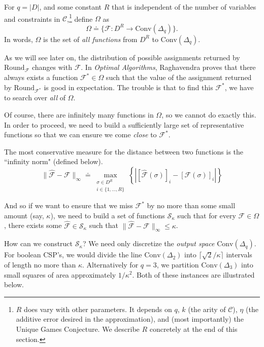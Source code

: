 \documentclass[letterpaper, 12pt]{article}
\numberwithin{equation}{section}
\begin{document}
For $q = |D|$, and some constant $R$ that is independent of the number of variables and constraints in $\mathcal{C}$,\footnote{$R$ does vary with other parameters. It depends on $q$, $k$ (the arity of $\mathcal{C}$), $\eta$ (the additive error desired in the approximation), and (most importantly) the Unique Games Conjecture. We describe $R$ concretely at the end of this section.}  define $\Omega$ as
\begin{equation}
\Omega \doteq \{ \mathcal{F} : D^R \to \text{Conv}(\Delta_q) \}.
\end{equation}
In words, $\Omega$ is the set of \textit{all functions} from $D^R$ to $\text{Conv}(\Delta_q)$.

As we will see later on, the distribution of possible assignments returned by $\text{Round}_{\mathcal{F}}$ changes with $\mathcal{F}$. In \textit{Optimal Algorithms}, Raghavendra proves that there always exists a function $\mathcal{F}^* \in \Omega$ such that the value of the assignment returned by $\text{Round}_{\mathcal{F}^*}$ is good in expectation. The trouble is that to find this $\mathcal{F}^*$, we have to search over \textit{all} of $\Omega$.

Of course, there are infinitely many functions in $\Omega$, so we cannot do exactly this. In order to proceed, we need to build a sufficiently large set of representative functions so that we can ensure we come \textit{close} to  $\mathcal{F}^*$.

The most conservative measure for the distance between two functions is the ``infinity norm" (defined below).
\begin{equation}
\| \hat{\mathcal{F}} - \mathcal{F} \|_{\infty} \doteq 
	\max_{\substack{\sigma \in D^R \\ i \in \{1,\ldots,R \}}} \left\{\left|\left[\hat{\mathcal{F}}(\sigma)\right]_i - \left[\mathcal{F}(\sigma)\right]_i\right|\right\}
\end{equation}

And so if we want to ensure that we miss $\mathcal{F}^*$ by no more than some small amount (say, $\kappa$), we need to build a set of functions $\mathcal{S}_\kappa$ such that for every $\mathcal{F} \in \Omega$, there exists some $\hat{\mathcal{F}} \in \mathcal{S}_\kappa$ such that $\| \hat{\mathcal{F}} - \mathcal{F} \|_{\infty} \leq \kappa $.

How can we construct $\mathcal{S}_\kappa$? We need only discretize the \textit{output space} $\text{Conv}(\Delta_q)$. For boolean CSP's, we would divide the line $\text{Conv}(\Delta_2)$ into $\lceil \sqrt{2}/\kappa \rceil$ intervals of length no more than $\kappa$. Alternatively for $ q = 3$, we partition $\text{Conv}(\Delta_3)$ into small squares of area approximately $1/\kappa^2$. Both of these instances are illustrated below.
\end{document}
